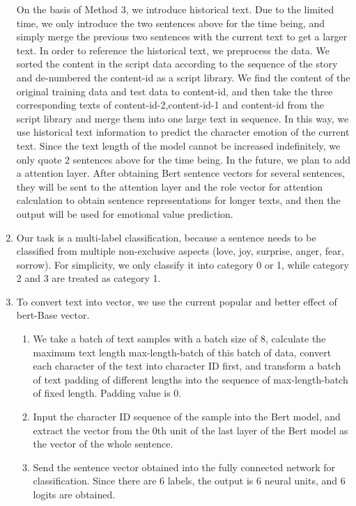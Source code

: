 \documentclass[12pt,twocolumn,letterpaper]{article}
\begin{document}
\begin{enumerate}
On the basis of Method 3, we introduce historical text. Due to the limited time, we only introduce the two sentences above for the time being, and simply merge the previous two sentences with the current text to get a larger text. In order to reference the historical text, we preprocess the data. We sorted the content in the script data according to the sequence of the story and de-numbered the content-id as a script library. We find the content of the original training data and test data to content-id, and then take the three corresponding texts of content-id-2,content-id-1 and content-id from the script library and merge them into one large text in sequence. 
In this way, we use historical text information to predict the character emotion of the current text. Since the text length of the model cannot be increased indefinitely, we only quote 2 sentences above for the time being. 
In the future, we plan to add a attention layer. After obtaining Bert sentence vectors for several sentences, they will be sent to the attention layer and the role vector for attention calculation to obtain sentence representations for longer texts, and then the output will be used for emotional value prediction. 


\item Our task is a multi-label classification, because a sentence needs to be classified from multiple non-exclusive aspects (love, joy, surprise, anger, fear, sorrow). For simplicity, we only classify it into category 0 or 1, while category 2 and 3 are treated as category 1.  

\item To convert text into vector, we use the current popular and better effect of bert-Base vector.

\begin{enumerate}
\item We take a batch of text samples with a batch size of 8, calculate the maximum text length max-length-batch of this batch of data, convert each character of the text into character ID first, and transform a batch of text padding of different lengths into the sequence of max-length-batch of fixed length. Padding value is 0. 

\item Input the character ID sequence of the sample into the Bert model, and extract the vector from the 0th unit of the last layer of the Bert model as the vector of the whole sentence.  
\item Send the sentence vector obtained into the fully connected network for classification. Since there are 6 labels, the output is 6 neural units, and 6 logits are obtained. 


\end{enumerate}
\end{enumerate}
\end{document}

